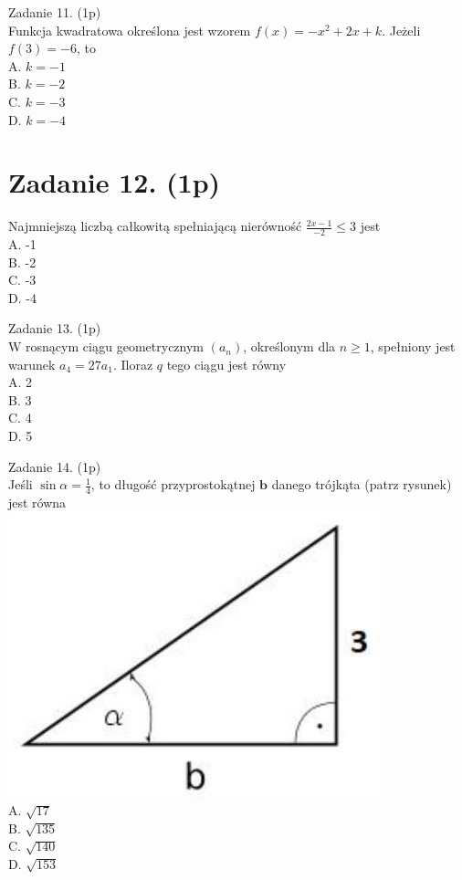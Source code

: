 \documentclass[10pt]{article}
\begin{document}
Zadanie 11. (1p)\\
Funkcja kwadratowa określona jest wzorem \(f(x)=-x^{2}+2 x+k\). Jeżeli \(f(3)=-6\), to\\
A. \(k=-1\)\\
B. \(k=-2\)\\
C. \(k=-3\)\\
D. \(k=-4\)

\section*{Zadanie 12. (1p)}
Najmniejszą liczbą całkowitą spełniającą nierówność \(\frac{2 x-1}{-2} \leq 3\) jest\\
A. -1\\
B. -2\\
C. -3\\
D. -4

Zadanie 13. (1p)\\
W rosnącym ciągu geometrycznym \(\left(a_{n}\right)\), określonym dla \(n \geq 1\), spełniony jest warunek \(a_{4}=27 a_{1}\). Iloraz \(q\) tego ciągu jest równy\\
A. 2\\
B. 3\\
C. 4\\
D. 5

Zadanie 14. (1p)\\
Jeśli \(\sin \alpha=\frac{1}{4}\), to długość przyprostokątnej \(\boldsymbol{b}\) danego trójkąta (patrz rysunek) jest równa\\
\includegraphics[max width=\textwidth, center]{2024_11_21_fb7e622176e162773107g-04}\\
A. \(\sqrt{17}\)\\
B. \(\sqrt{135}\)\\
C. \(\sqrt{140}\)\\
D. \(\sqrt{153}\)
\end{document}
